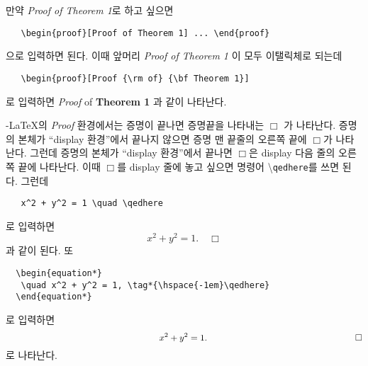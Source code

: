 \documentclass[a4paper,10pt]{amsproc}
\begin{document}
만약 \textit{Proof of Theorem 1}로 하고 싶으면
\begin{verbatim}
   \begin{proof}[Proof of Theorem 1] ... \end{proof}
\end{verbatim}
으로 입력하면 된다. 이때 앞머리 \textit{Proof of Theorem 1} 이 모두
이탤릭체로 되는데
\begin{verbatim}
   \begin{proof}[Proof {\rm of} {\bf Theorem 1}]
\end{verbatim}
로 입력하면 \textit{Proof} of \textbf{Theorem 1} 과 같이
나타난다.

\AmS-\LaTeX 의 \textit{Proof} 환경에서는 증명이 끝나면 증명끝을
나타내는 $\Box$ 가 나타난다. 증명의 본체가 ``display 환경''에서 끝나지
않으면 증명 맨 끝줄의 오른쪽 끝에 $\Box$가 나타난다.  그런데 증명의
본체가 ``display 환경''에서 끝나면 $\Box$은 display 다음 줄의 오른쪽
끝에 나타난다. 이때 $\Box$를 display 줄에 놓고 싶으면 명령어
\textbackslash \texttt{qedhere}를 쓰면 된다. 그런데
\begin{verbatim}
   x^2 + y^2 = 1 \quad \qedhere
\end{verbatim}
로 입력하면
$$   x^2+y^2=1. \quad \Box   $$
과 같이 된다.  또
\begin{verbatim}
  \begin{equation*}
   \quad x^2 + y^2 = 1, \tag*{\hspace{-1em}\qedhere}
  \end{equation*}
\end{verbatim}
로 입력하면
\begin{equation*}
  \hskip60mm x^2+y^2=1.  \hskip58mm\Box
\end{equation*}
로 나타난다.
\end{document}
